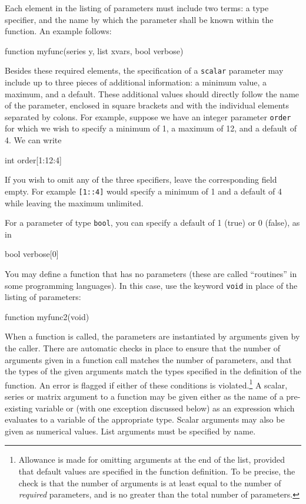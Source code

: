 Each element in the listing of parameters must include two terms: a
type specifier, and the name by which the parameter shall be known
within the function.  An example follows:
%    
\begin{code}
      function myfunc(series y, list xvars, bool verbose)
\end{code}

Besides these required elements, the specification of a
\texttt{scalar} parameter may include up to three pieces of additional
information: a minimum value, a maximum, and a default.  These
additional values should directly follow the name of the parameter,
enclosed in square brackets and with the individual elements separated
by colons.  For example, suppose we have an integer parameter
\texttt{order} for which we wish to specify a minimum of 1, a maximum
of 12, and a default of 4.  We can write
%    
\begin{code}
      int order[1:12:4]
\end{code} 
%
If you wish to omit any of the three specifiers, leave the
corresponding field empty.  For example \texttt{[1::4]} would specify
a minimum of 1 and a default of 4 while leaving the maximum
unlimited.  

For a parameter of type \texttt{bool}, you can specify a default of
1 (true) or 0 (false), as in
%    
\begin{code}
      bool verbose[0]
\end{code} 
%

You may define a function that has no parameters (these are called
``routines'' in some programming languages).  In this case,  
use the keyword \texttt{void} in place of the listing of parameters:
%    
\begin{code}
      function myfunc2(void)
\end{code}

When a function is called, the parameters are instantiated by
arguments given by the caller.  There are automatic checks in place to
ensure that the number of arguments given in a function call matches
the number of parameters, and that the types of the given arguments
match the types specified in the definition of the function.  An error
is flagged if either of these conditions is
violated.\footnote{Allowance is made for omitting arguments at the end
  of the list, provided that default values are specified in the
  function definition.  To be precise, the check is that the number of
  arguments is at least equal to the number of \textit{required}
  parameters, and is no greater than the total number of parameters.}
A scalar, series or matrix argument to a function may be given either
as the name of a pre-existing variable or (with one exception
discussed below) as an expression which evaluates to a variable of the
appropriate type.  Scalar arguments may also be given as numerical
values.  List arguments must be specified by name.
    
